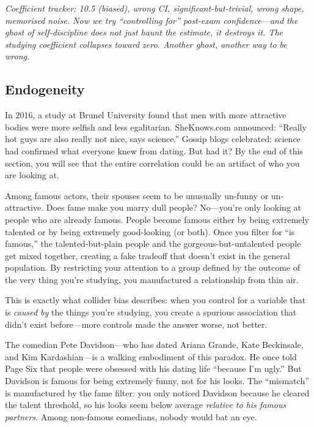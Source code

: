 \documentclass[11pt,a4paper]{article}
\theoremstyle{definition}
\theoremstyle{plain}
\theoremstyle{remark}
\begin{document}
\noindent\textit{Coefficient tracker: 10.5 (biased), wrong CI, significant-but-trivial, wrong shape, memorised noise. Now we try ``controlling for'' post-exam confidence---and the ghost of self-discipline does not just haunt the estimate, it destroys it. The studying coefficient collapses toward zero. Another ghost, another way to be wrong.}

\subsection{Endogeneity}

\begin{keyinsight}[title={The ``Hot Guys Are Jerks'' Study}]
In 2016, a study at Brunel University found that men with more attractive bodies were more selfish and less egalitarian. SheKnows.com announced: ``Really hot guys are also really not nice, says science.'' Gossip blogs celebrated: science had confirmed what everyone knew from dating. But had it? By the end of this section, you will see that the entire correlation could be an artifact of who you are looking at.
\end{keyinsight}

\begin{toystory}[title={Why Every Movie Star's Spouse Seems Boring}]
Among famous actors, their spouses seem to be unusually un-funny or un-attractive. Does fame make you marry dull people? No---you're only looking at people who are already famous. People become famous either by being extremely talented or by being extremely good-looking (or both). Once you filter for ``is famous,'' the talented-but-plain people and the gorgeous-but-untalented people get mixed together, creating a fake tradeoff that doesn't exist in the general population. By restricting your attention to a group defined by the outcome of the very thing you're studying, you manufactured a relationship from thin air.

This is exactly what collider bias describes: when you control for a variable that is \emph{caused by} the things you're studying, you create a spurious association that didn't exist before---more controls made the answer worse, not better.
\end{toystory}

The comedian Pete Davidson---who has dated Ariana Grande, Kate Beckinsale, and Kim Kardashian---is a walking embodiment of this paradox. He once told Page Six that people were obsessed with his dating life ``because I'm ugly.'' But Davidson is famous for being extremely funny, not for his looks. The ``mismatch'' is manufactured by the fame filter: you only noticed Davidson because he cleared the talent threshold, so his looks seem below average \emph{relative to his famous partners}. Among non-famous comedians, nobody would bat an eye.
\end{document}
